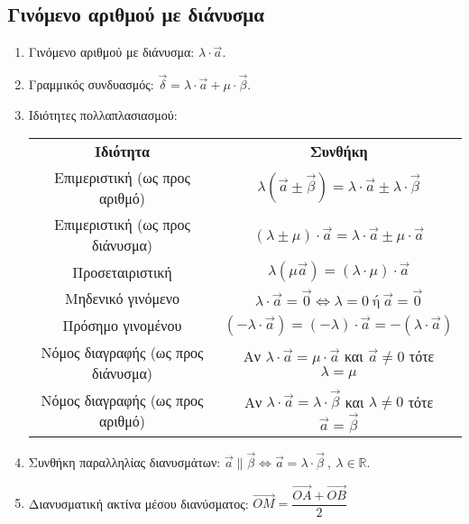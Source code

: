 \documentclass[11pt,a4paper]{article}
\begin{document}
\subsection{Γινόμενο αριθμού με διάνυσμα}
\begin{enumerate}
\item Γινόμενο αριθμού με διάνυσμα: $ \lambda\cdot\vec{a} $.
\item Γραμμικός συνδυασμός: $ \vec{\delta}=\lambda\cdot\vec{a}+\mu\cdot\vec{\beta} $.
\item Ιδιότητες πολλαπλασιασμού:
\begin{center}
\begin{longtable}{cc}
\hline \rule[-2ex]{0pt}{5.5ex} \textbf{Ιδιότητα} & \textbf{Συνθήκη} \\ 
\hhline{==} \rule[-2ex]{0pt}{5.5ex} Επιμεριστική (ως προς αριθμό) & $ \lambda\left( \vec{a}\pm\vec{\beta}\right)=\lambda\cdot\vec{a}\pm\lambda\cdot\vec{\beta} $ \\ 
\rule[-2ex]{0pt}{5.5ex} Επιμεριστική (ως προς διάνυσμα) & $ \left( \lambda\pm\mu\right)\cdot\vec{a}=\lambda\cdot\vec{a}\pm\mu\cdot\vec{a} $ \\
\rule[-2ex]{0pt}{5.5ex} Προσεταιριστική & $ \lambda\left( \mu\vec{a}\right)=\left( \lambda\cdot\mu\right)\cdot\vec{a} $ \\ 
\rule[-2ex]{0pt}{5.5ex} Μηδενικό γινόμενο & $ \lambda\cdot\vec{a}=\vec{0}\Leftrightarrow \lambda=0 \ \textrm{ή}\ \vec{a}=\vec{0} $ \\ 
\rule[-2ex]{0pt}{5.5ex} Πρόσημο γινομένου & $ \left( -\lambda\cdot\vec{a}\right)=(-\lambda)\cdot\vec{a}=-\left( \lambda\cdot\vec{a}\right)  $ \\ 
\rule[-2ex]{0pt}{5.5ex} Νόμος διαγραφής (ως προς διάνυσμα) & Αν $ \lambda\cdot\vec{a}=\mu\cdot\vec{a} $ και $ \vec{a}\neq0 $ τότε $ \lambda=\mu $ \\ 
\rule[-2ex]{0pt}{5.5ex} Νόμος διαγραφής (ως προς αριθμό) & Αν $ \lambda\cdot\vec{a}=\lambda\cdot\vec{\beta} $ και $ \lambda\neq0 $ τότε $ \vec{a}=\vec{\beta} $\\ 
\hline 
\end{longtable}
\end{center}
\vspace{-5mm}
\item Συνθήκη παραλληλίας διανυσμάτων: $ \vec{a}\parallel\vec{\beta}\Leftrightarrow \vec{a}=\lambda\cdot\vec{\beta}\ ,\ \lambda\in\mathbb{R} $.
\item Διανυσματική ακτίνα μέσου διανύσματος: $ \overrightarrow{OM}=\dfrac{\overrightarrow{OA}+\overrightarrow{OB}}{2} $
\end{enumerate}
\end{document}
